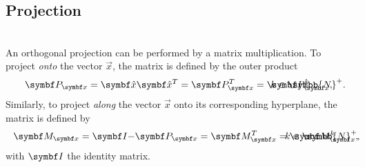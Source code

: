\subsection*{Projection}
\cite{projection_matrix}\\
An orthogonal projection can be performed by a matrix multiplication. To project \emph{onto} the vector $\vec{x}$, the matrix is defined by the outer product
\begin{align*}
\lcr{}{
\projmat{x} = \uvec{x} \uvec{x}^T = \projmat{x}^T =
\projmat{x}^k,
}{
k \in \symbb{N}^+.
}
\end{align*}
Similarly, to project \emph{along} the vector $\vec{x}$ onto its corresponding hyperplane, the matrix is defined by
\begin{align*}
\lcr{}{
\resprojmat{x} = \mat{I} - \projmat{x} = \resprojmat{x}^T = \resprojmat{x}^k,
}{
k \in \symbb{N}^+,
}
\end{align*}
with $\mat{I}$ the identity matrix.
